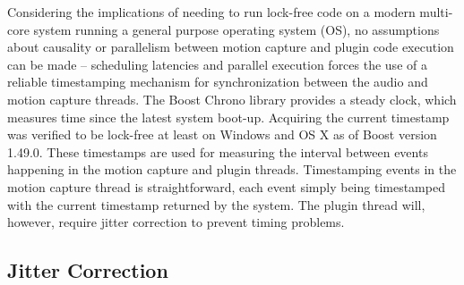Considering the implications of needing to run lock-free code on
a modern multi-core system running a general purpose
operating system (OS),
no assumptions about causality or parallelism between
motion capture and plugin code execution can be made --
scheduling latencies and parallel execution forces the use
of a reliable timestamping mechanism for synchronization between
the audio and motion capture threads.
The Boost Chrono library provides a steady clock,
which measures time since the latest system boot-up.
Acquiring the current timestamp was verified to be lock-free
at least on Windows and OS X as of Boost version 1.49.0.
These timestamps are used for measuring the interval between
events happening in the motion capture and plugin threads.
Timestamping events in the motion capture thread is straightforward,
each event simply being timestamped with
the current timestamp returned by the system.
The plugin thread will, however,
require jitter correction to prevent timing problems.

\subsection{Jitter Correction}

